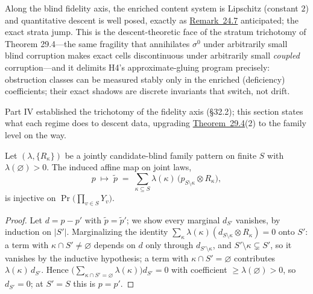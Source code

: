 \begin{thmrem}

Along the blind fidelity axis, the enriched content system is Lipschitz (constant \(2\)) and quantitative descent is well posed, exactly as \hyperlink{stmt:24.7}{Remark~24.7} anticipated; the exact strata jump. This is the descent-theoretic face of the stratum trichotomy of Theorem 29.4---\hspace{0pt}the same fragility that annihilates \(\sigma^0\) under arbitrarily small blind corruption makes exact cells discontinuous under arbitrarily small \emph{coupled} corruption---\hspace{0pt}and it delimits H4's approximate-gluing program precisely: obstruction classes can be measured stably only in the enriched (deficiency) coefficients; their exact shadows are discrete invariants that switch, not drift.
\end{thmrem}


Part IV established the trichotomy of the fidelity axis (§32.2); this section states what each regime does to descent data, upgrading \hyperlink{stmt:29.4}{Theorem~29.4}(2) to the family level on the way.

\begin{thmplain}

Let \((\lambda, \{R_\kappa\})\) be a jointly candidate-blind family pattern on finite \(S\) with \(\lambda(\varnothing) > 0\). The induced affine map on joint laws,
\[
p \;\longmapsto\; \widetilde{p} \;=\; \sum_{\kappa \subseteq S} \lambda(\kappa)\, \big( p_{S \setminus \kappa} \otimes R_\kappa \big),
\]
is injective on \(\Pr\big(\prod_{v \in S} Y_v\big)\).
\end{thmplain}

\begin{proof}

Let \(d = p - p'\) with \(\widetilde{p} = \widetilde{p}'\); we show every marginal \(d_{S'}\) vanishes, by induction on \(|S'|\). Marginalizing the identity \(\sum_\kappa \lambda(\kappa)(d_{S\setminus\kappa} \otimes R_\kappa) = 0\) onto \(S'\): a term with \(\kappa \cap S' \ne \varnothing\) depends on \(d\) only through \(d_{S' \setminus \kappa}\), and \(S' \setminus \kappa \subsetneq S'\), so it vanishes by the inductive hypothesis; a term with \(\kappa \cap S' = \varnothing\) contributes \(\lambda(\kappa)\, d_{S'}\). Hence \(\big(\sum_{\kappa \cap S' = \varnothing} \lambda(\kappa)\big) d_{S'} = 0\) with coefficient \(\ge \lambda(\varnothing) > 0\), so \(d_{S'} = 0\); at \(S' = S\) this is \(p = p'\).
\end{proof}

